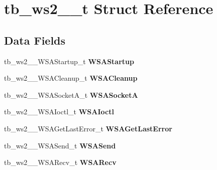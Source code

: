 \hypertarget{structtb__ws2__32__t}{\section{tb\-\_\-ws2\-\_\-\_\-t Struct Reference}
\label{structtb__ws2__32__t}
}
\subsection*{Data Fields}
\begin{DoxyCompactItemize}
\item 
\hypertarget{structtb__ws2__32__t_ae8937c6b8efa661ed1990544812a129b}{tb\-\_\-ws2\-\_\-\_\-\-W\-S\-A\-Startup\-\_\-t {\bfseries W\-S\-A\-Startup}}\label{structtb__ws2__32__t_ae8937c6b8efa661ed1990544812a129b}

\item 
\hypertarget{structtb__ws2__32__t_ac7459bc8f6640e53460d61cb9f7a8c74}{tb\-\_\-ws2\-\_\-\_\-\-W\-S\-A\-Cleanup\-\_\-t {\bfseries W\-S\-A\-Cleanup}}\label{structtb__ws2__32__t_ac7459bc8f6640e53460d61cb9f7a8c74}

\item 
\hypertarget{structtb__ws2__32__t_afdb9b767ca8e0c4ef5bf250961f543a5}{tb\-\_\-ws2\-\_\-\_\-\-W\-S\-A\-Socket\-A\-\_\-t {\bfseries W\-S\-A\-Socket\-A}}\label{structtb__ws2__32__t_afdb9b767ca8e0c4ef5bf250961f543a5}

\item 
\hypertarget{structtb__ws2__32__t_a9a515f570d3199fde79f1724f57662f0}{tb\-\_\-ws2\-\_\-\_\-\-W\-S\-A\-Ioctl\-\_\-t {\bfseries W\-S\-A\-Ioctl}}\label{structtb__ws2__32__t_a9a515f570d3199fde79f1724f57662f0}

\item 
\hypertarget{structtb__ws2__32__t_a610ee691233f88a1108d4e82d9f081f9}{tb\-\_\-ws2\-\_\-\_\-\-W\-S\-A\-Get\-Last\-Error\-\_\-t {\bfseries W\-S\-A\-Get\-Last\-Error}}\label{structtb__ws2__32__t_a610ee691233f88a1108d4e82d9f081f9}

\item 
\hypertarget{structtb__ws2__32__t_a6a2a2ee715daca5795296ea926c915a2}{tb\-\_\-ws2\-\_\-\_\-\-W\-S\-A\-Send\-\_\-t {\bfseries W\-S\-A\-Send}}\label{structtb__ws2__32__t_a6a2a2ee715daca5795296ea926c915a2}

\item 
\hypertarget{structtb__ws2__32__t_af78821a989729a4f0371d778b5e5f3fe}{tb\-\_\-ws2\-\_\-\_\-\-W\-S\-A\-Recv\-\_\-t {\bfseries W\-S\-A\-Recv}}\label{structtb__ws2__32__t_af78821a989729a4f0371d778b5e5f3fe}


\end{DoxyCompactItemize}
